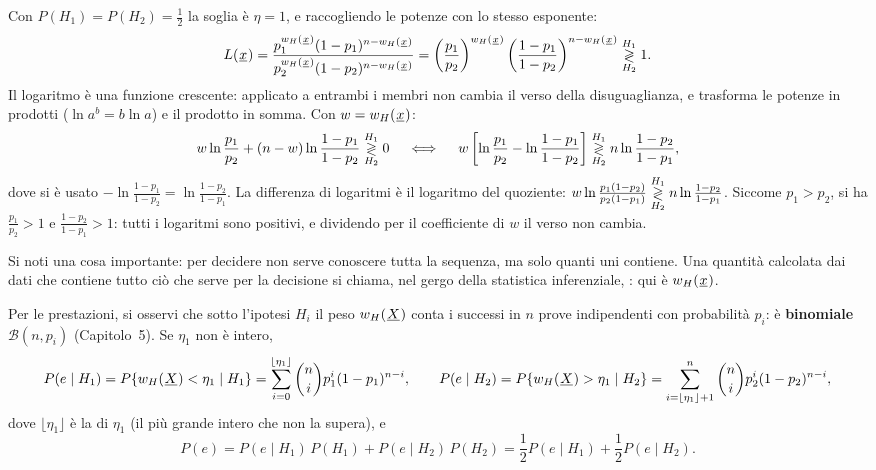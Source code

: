 \begin{dimostrazione}
 Con $P(H_1) = P(H_2) = \frac12$ la soglia è $\eta = 1$, e raccogliendo le
potenze con lo stesso esponente:
\[ L(\vett{x}) = \frac{p_1^{w_H(\vett{x})} (1 - p_1)^{n - w_H(\vett{x})}}{p_2^{w_H(\vett{x})} (1 - p_2)^{n -
   w_H(\vett{x})}} = \left( \frac{p_1}{p_2} \right)^{w_H(\vett{x})} \left( \frac{1 - p_1}{1 - p_2} \right)^{n -
   w_H(\vett{x})} \decidi{H_1}{H_2} 1 . \]
 Il logaritmo è una funzione crescente: applicato a entrambi i membri non cambia il verso della
disuguaglianza, e trasforma le potenze in prodotti ($\ln a^b = b \ln a$) e il prodotto in somma. Con $w = w_H(\vett{x})$:
\[ w \ln \frac{p_1}{p_2} + (n - w) \ln \frac{1 - p_1}{1 - p_2} \decidi{H_1}{H_2} 0 \quad\iff\quad w \left[ \ln
   \frac{p_1}{p_2} - \ln \frac{1 - p_1}{1 - p_2} \right] \decidi{H_1}{H_2} n \ln \frac{1 - p_2}{1 - p_1} , \]
dove si è usato $-\ln \frac{1 - p_1}{1 - p_2} = \ln \frac{1 - p_2}{1 - p_1}$.
 La differenza di logaritmi è il logaritmo del quoziente:
$w \ln \frac{p_1 (1 - p_2)}{p_2 (1 - p_1)} \decidi{H_1}{H_2} n \ln \frac{1 - p_2}{1 - p_1}$. Siccome $p_1 > p_2$, si ha
$\frac{p_1}{p_2} > 1$ e $\frac{1 - p_2}{1 - p_1} > 1$: tutti i logaritmi sono positivi, e dividendo per il
coefficiente di $w$ il verso non cambia.
\end{dimostrazione}

Si noti una cosa importante: per decidere non serve conoscere tutta la sequenza, ma solo quanti uni contiene. Una
quantità calcolata dai dati che contiene tutto ciò che serve per la decisione si chiama, nel gergo della statistica
inferenziale, : qui è $w_H(\vett{x})$.

Per le prestazioni, si osservi che sotto l'ipotesi $H_i$ il peso $w_H(\vett{X})$ conta i successi in $n$ prove
indipendenti con probabilità $p_i$: è \textbf{binomiale} $\mathcal{B}(n, p_i)$ (Capitolo~5). Se $\eta_1$ non è intero,
\[ P(e \mid H_1) = P\{w_H(\vett{X}) < \eta_1 \mid H_1\} = \sum_{i=0}^{\lfloor \eta_1 \rfloor} \binom{n}{i} p_1^i (1 -
   p_1)^{n - i} , \qquad P(e \mid H_2) = P\{w_H(\vett{X}) > \eta_1 \mid H_2\} = \sum_{i = \lfloor \eta_1 \rfloor +
   1}^{n} \binom{n}{i} p_2^i (1 - p_2)^{n - i} , \]
dove $\lfloor \eta_1 \rfloor$ è la  di $\eta_1$ (il più grande intero che non la supera), e
\[ P(e) = P(e \mid H_1)\, P(H_1) + P(e \mid H_2)\, P(H_2) = \frac12 P(e \mid H_1) + \frac12 P(e \mid H_2) . \]


